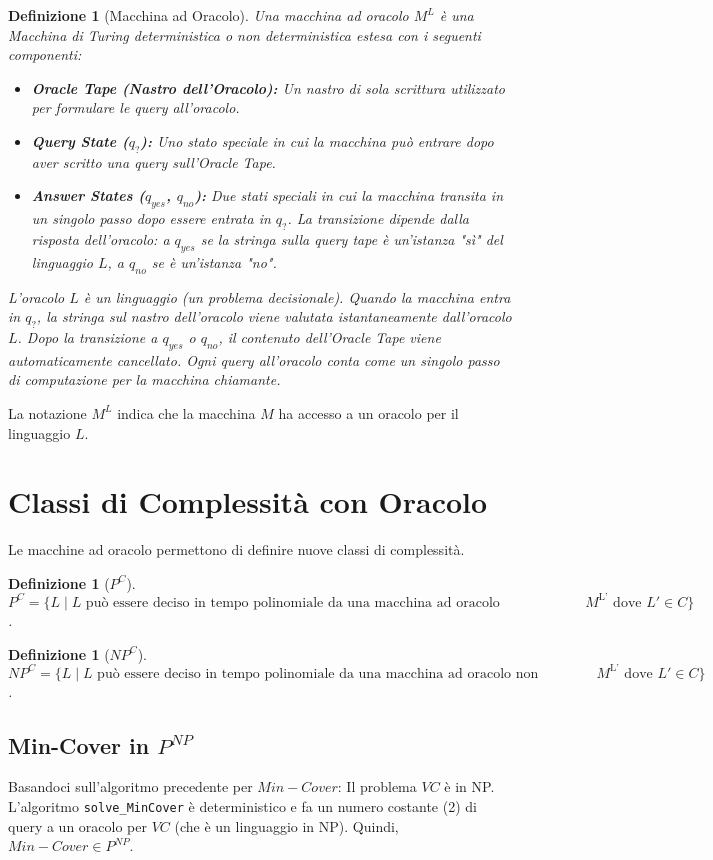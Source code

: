 \documentclass[a4paper, 11pt]{book} %
\newtheorem{definition}[theorem]{Definizione}
\theoremstyle{definition}
\begin{document}
\begin{definition}[Macchina ad Oracolo]
Una macchina ad oracolo $M^L$ è una Macchina di Turing deterministica o non deterministica estesa con i seguenti componenti:
\begin{itemize}
    \item \textbf{Oracle Tape (Nastro dell'Oracolo):} Un nastro di sola scrittura utilizzato per formulare le query all'oracolo.
    \item \textbf{Query State ($q_?$):} Uno stato speciale in cui la macchina può entrare dopo aver scritto una query sull'Oracle Tape.
    \item \textbf{Answer States ($q_{yes}$, $q_{no}$):} Due stati speciali in cui la macchina transita in un singolo passo dopo essere entrata in $q_?$. La transizione dipende dalla risposta dell'oracolo: a $q_{yes}$ se la stringa sulla query tape è un'istanza "sì" del linguaggio $L$, a $q_{no}$ se è un'istanza "no".
\end{itemize}
L'oracolo $L$ è un linguaggio (un problema decisionale). Quando la macchina entra in $q_?$, la stringa sul nastro dell'oracolo viene valutata istantaneamente dall'oracolo $L$. Dopo la transizione a $q_{yes}$ o $q_{no}$, il contenuto dell'Oracle Tape viene automaticamente cancellato. Ogni query all'oracolo conta come un singolo passo di computazione per la macchina chiamante.
\end{definition}
La notazione $M^L$ indica che la macchina $M$ ha accesso a un oracolo per il linguaggio $L$.

\section{Classi di Complessità con Oracolo}
Le macchine ad oracolo permettono di definire nuove classi di complessità.
\begin{definition}[$P^C$]
$P^C = \{ L \mid L \text{ può essere deciso in tempo polinomiale da una macchina ad oracolo deterministica } M^{\text{L'}} \text{ dove } L' \in C \}$.
\end{definition}
\begin{definition}[$NP^C$]
$NP^C = \{ L \mid L \text{ può essere deciso in tempo polinomiale da una macchina ad oracolo non deterministica } M^{\text{L'}} \text{ dove } L' \in C \}$.
\end{definition}

\subsection{Min-Cover in $P^{NP}$}
Basandoci sull'algoritmo precedente per $Min-Cover$:
Il problema $VC$ è in NP. L'algoritmo \texttt{solve\_MinCover} è deterministico e fa un numero costante (2) di query a un oracolo per $VC$ (che è un linguaggio in NP).
Quindi, $Min-Cover \in P^{NP}$.
\end{document}
